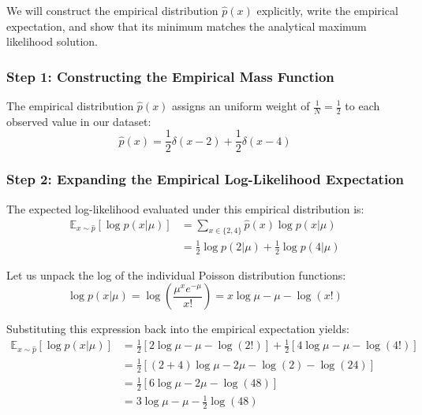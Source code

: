 \documentclass{article}
\begin{document}
We will construct the empirical distribution $\hat{p}(x)$ explicitly, write the empirical expectation, and show that its minimum matches the analytical maximum likelihood solution.

\subsubsection{Step 1: Constructing the Empirical Mass Function}
The empirical distribution $\hat{p}(x)$ assigns an uniform weight of $\frac{1}{N} = \frac{1}{2}$ to each observed value in our dataset:
\begin{equation}
\hat{p}(x) = \frac{1}{2}\delta(x-2) + \frac{1}{2}\delta(x-4)
\end{equation}

\subsubsection{Step 2: Expanding the Empirical Log-Likelihood Expectation}
The expected log-likelihood evaluated under this empirical distribution is:
\begin{align*}
\mathbb{E}_{x \sim \hat{p}}[\log p(x|\mu)] &= \sum_{x \in \{2, 4\}} \hat{p}(x) \log p(x|\mu) \\
&= \frac{1}{2} \log p(2|\mu) + \frac{1}{2} \log p(4|\mu)
\end{align*}

Let us unpack the log of the individual Poisson distribution functions:
\begin{equation}
\log p(x|\mu) = \log\left(\frac{\mu^x e^{-\mu}}{x!}\right) = x\log\mu - \mu - \log(x!)
\end{equation}

Substituting this expression back into the empirical expectation yields:
\begin{align*}
\mathbb{E}_{x \sim \hat{p}}[\log p(x|\mu)] &= \frac{1}{2}\left[2\log\mu - \mu - \log(2!)\right] + \frac{1}{2}\left[4\log\mu - \mu - \log(4!)\right] \\
&= \frac{1}{2}\left[(2+4)\log\mu - 2\mu - \log(2) - \log(24)\right] \\
&= \frac{1}{2}\left[6\log\mu - 2\mu - \log(48)\right] \\
&= 3\log\mu - \mu - \frac{1}{2}\log(48)
\end{align*}
\end{document}
